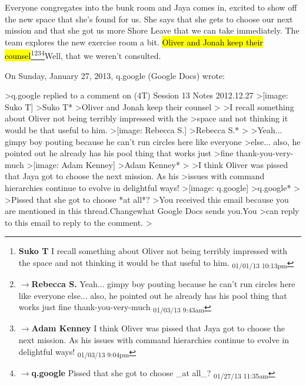 
Everyone congregates into the bunk room and Jaya comes in, excited to show off the new space that she's found for us.  She says that she gets to choose our next mission and that she got us more Shore Leave that we can take immediately.  The team explores the new exercise room a bit.  \hl{Oliver and Jonah keep their counsel}\footnote{\textbf{Suko T }I recall something about Oliver not being terribly impressed with the space and not thinking it would be that useful to him. \textsubscript{01/01/13 10:13pm}}\footnote{$\rightarrow$\textbf{Rebecca S. }Yeah... gimpy boy pouting because he can't run circles here like everyone else... also, he pointed out he already has his pool thing that works just fine thank-you-very-much \textsubscript{01/03/13 9:43am}}\footnote{$\rightarrow$\textbf{Adam Kenney }I think Oliver was pissed that Jaya got to choose the next mission.  As his issues with command hierarchies continue to evolve in delightful ways! \textsubscript{01/03/13 9:04pm}}\footnote{$\rightarrow$\textbf{q.google }Pissed that she got to choose \_at all\_? \textsubscript{01/27/13 11:35am}}Well, that we weren't consulted. 
 
On Sunday, January 27, 2013, q.google (Google Docs) wrote: 
 
\textgreater  q.google replied to a comment on (4T) Session 13 Notes 2012.12.27 
\textgreater  {[}image: Suko T{]} 
\textgreater  *Suko T* 
\textgreater  Oliver and Jonah keep their counsel 
\textgreater  
\textgreater  I recall something about Oliver not being terribly impressed with the 
\textgreater  space and not thinking it would be that useful to him. 
\textgreater  {[}image: Rebecca S.{]} 
\textgreater  *Rebecca S.* 
\textgreater  
\textgreater  Yeah... gimpy boy pouting because he can't run circles here like everyone 
\textgreater  else... also, he pointed out he already has his pool thing that works just 
\textgreater  fine thank-you-very-much 
\textgreater  {[}image: Adam Kenney{]} 
\textgreater  *Adam Kenney* 
\textgreater  
\textgreater  I think Oliver was pissed that Jaya got to choose the next mission. As his 
\textgreater  issues with command hierarchies continue to evolve in delightful ways! 
\textgreater  {[}image: q.google{]} 
\textgreater  *q.google* 
\textgreater  
\textgreater  Pissed that she got to choose *at all*? 
\textgreater  You received this email because you are mentioned in this thread.Changewhat Google Docs sends you.You 
\textgreater  can reply to this email to reply to the comment. 
\textgreater  
 
